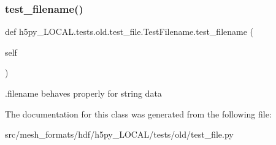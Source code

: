 \subsubsection{\texorpdfstring{test\+\_\+filename()}{test\_filename()}}
{\footnotesize\ttfamily def h5py\+\_\+\+L\+O\+C\+A\+L.\+tests.\+old.\+test\+\_\+file.\+Test\+Filename.\+test\+\_\+filename (\begin{DoxyParamCaption}\item[{}]{self }\end{DoxyParamCaption})}

\begin{DoxyVerb}.filename behaves properly for string data \end{DoxyVerb}
 

The documentation for this class was generated from the following file\+:\begin{DoxyCompactItemize}
\item 
src/mesh\+\_\+formats/hdf/h5py\+\_\+\+L\+O\+C\+A\+L/tests/old/test\+\_\+file.\+py\end{DoxyCompactItemize}
